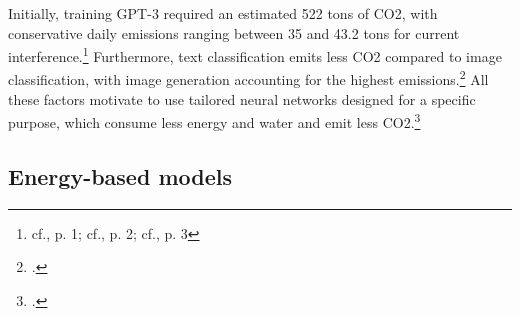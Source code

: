 Initially, training GPT-3 required an estimated 522 tons of CO2, with conservative daily emissions ranging between 35 and 43.2 tons for current interference.\footnote{cf.\cite{anon.CloserLookCarbon2023}, p. 1; cf.\cite{chienReducingCarbonImpact2023}, p. 2; cf.\cite{tomlinsonCarbonEmissionsWriting2024}, p. 3}
Furthermore, text classification emits less CO2 compared to image classification, with image generation accounting for the highest emissions.\footcite[cf.][1-14]{luccioniPowerHungryProcessing2023}
All these factors motivate to use tailored neural networks designed for a specific purpose, which consume less energy and water and emit less CO2.\footcite[ibid cf.][1-14]{luccioniPowerHungryProcessing2023}

\subsection{Energy-based models}

